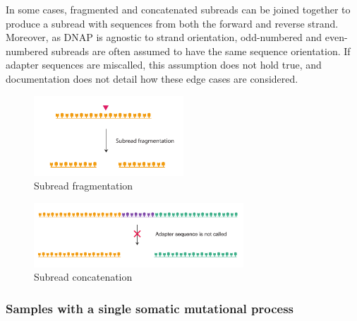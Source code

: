 In some cases, fragmented and concatenated subreads can be joined together to produce a subread with sequences from both the forward and reverse strand. Moreover, as DNAP is agnostic to strand orientation, odd-numbered and even-numbered subreads are often assumed to have the same sequence orientation. If adapter sequences are miscalled, this assumption does not hold true, and documentation does not detail how these edge cases are considered.

\begin{figure}[htbp!]
\caption{Subread fragmentation}
\label{figure:subread-fragmentation}
\begin{centering}
\includegraphics[width=0.5\textwidth]{Vector/subread-fragmentation.pdf}
\end{centering}
\end{figure}

\begin{figure}[htbp!]
\caption{Subread concatenation }
\label{figure:subread-concatenation}
\begin{centering}
\includegraphics[width=0.7\textwidth]{Vector/subread_concatenation.pdf}
\end{centering}
\end{figure}

\subsubsection{Samples with a single somatic mutational process}

